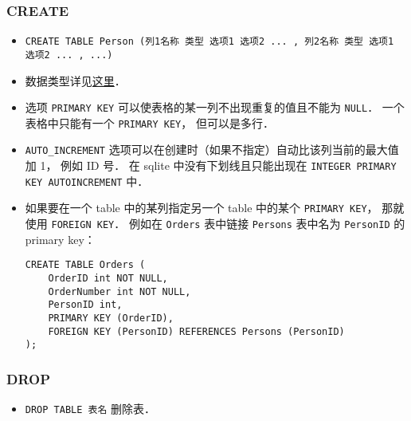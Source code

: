 \subsubsection{CREATE}
\begin{itemize}
\item \verb|CREATE TABLE Person (列1名称 类型 选项1 选项2 ... , 列2名称 类型 选项1 选项2 ... , ...)|
\item 数据类型详见\href{https://www.w3schools.com/sql/sql_datatypes.asp}{这里}．
\item 选项 \verb|PRIMARY KEY| 可以使表格的某一列不出现重复的值且不能为 \verb|NULL|． 一个表格中只能有一个 \verb|PRIMARY KEY|， 但可以是多行．
\item \verb|AUTO_INCREMENT| 选项可以在创建时（如果不指定）自动比该列当前的最大值加 1， 例如 ID 号． 在 sqlite 中没有下划线且只能出现在 \verb|INTEGER PRIMARY KEY AUTOINCREMENT| 中．
\item 如果要在一个 table 中的某列指定另一个 table 中的某个 \verb|PRIMARY KEY|， 那就使用 \verb|FOREIGN KEY|． 例如在 \verb|Orders| 表中链接 \verb|Persons| 表中名为 \verb|PersonID| 的 primary key：
\begin{lstlisting}
CREATE TABLE Orders (
    OrderID int NOT NULL,
    OrderNumber int NOT NULL,
    PersonID int,
    PRIMARY KEY (OrderID),
    FOREIGN KEY (PersonID) REFERENCES Persons (PersonID)
);
\end{lstlisting}
\end{itemize}

\subsubsection{DROP}
\begin{itemize}
\item \verb|DROP TABLE 表名| 删除表．
\end{itemize}

